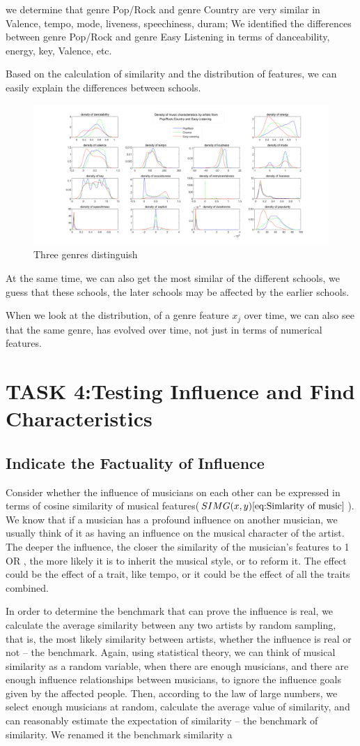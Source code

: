 \documentclass[conference]{IEEEtran}
\begin{document}
we determine that genre Pop/Rock and genre Country are very similar in Valence, tempo, mode, liveness, speechiness, duram;
We identified the differences between genre Pop/Rock and genre Easy Listening in terms of danceability, energy, key, Valence, etc.

Based on the calculation of similarity and the distribution of features, we can easily explain the differences between schools.
\begin{figure}[htbp]
	\centering
	\includegraphics[width=.5\textwidth]{./img/pop_coutry_easy}
	\caption{Three genres distinguish}\label{fig:pop_country_easy}
\end{figure}
At the same time, we can also get the most similar of the different schools, we guess that these schools, the later schools may be affected by the earlier schools.

When we look at the distribution, of a genre feature $x_j$ over time, we can also see that the same genre, has evolved over time, not just in terms of numerical features.
\section{TASK 4:Testing Influence and Find Characteristics}
\subsection{Indicate the Factuality of Influence}
Consider whether the influence of musicians on each other can be expressed in terms of cosine similarity of musical features($SIMG(x,y)\eqref{eq:Simlarity of music}$). We know that if a musician has a profound influence on another musician, we usually think of it as having an influence on the musical character of the artist. The deeper the influence, the closer the similarity of the musician’s features to 1 OR , the more likely it is to inherit the musical style, or to reform it. The effect could be the effect of a trait, like tempo, or it could be the effect of all the traits combined.

In order to determine the benchmark that can prove the influence is real, we calculate the average similarity between any two artists by random sampling, that is, the most likely similarity between artists, whether the influence is real or not -- the benchmark. Again, using statistical theory, we can think of musical similarity as a random variable, when there are enough musicians, and there are enough influence relationships between musicians, to ignore the influence goals given by the affected people. Then, according to the law of large numbers, we select enough musicians at random, calculate the average value of similarity, and can reasonably estimate the expectation of similarity -- the benchmark of similarity.
We renamed it the benchmark similarity a%
\end{document}
